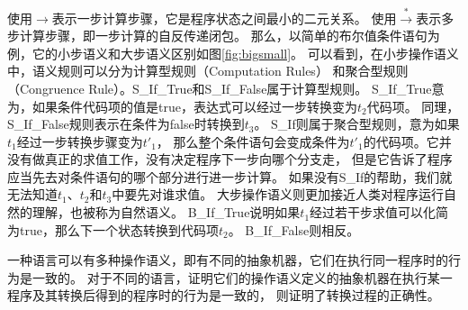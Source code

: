 使用$\rightarrow $表示一步计算步骤，它是程序状态之间最小的二元关系。
使用$\xrightarrow{*} $表示多步计算步骤，即一步计算的自反传递闭包。
那么，以简单的布尔值条件语句为例，它的小步语义和大步语义区别如图\ref{fig:bigsmall}。
可以看到，在小步操作语义中，语义规则可以分为计算型规则（Computation Rules）
和聚合型规则（Congruence Rule）。S\_If\_True和S\_If\_False属于计算型规则。
S\_If\_True意为，如果条件代码项的值是true，表达式可以经过一步转换变为$t_2$代码项。
同理，S\_If\_False规则表示在条件为false时转换到$t_3$。
S\_If则属于聚合型规则，意为如果$t_1$经过一步转换步骤变为$t'_1$，
那么整个条件语句会变成条件为$t'_1$的代码项。它并没有做真正的求值工作，没有决定程序下一步向哪个分支走，
但是它告诉了程序应当先去对条件语句的哪个部分进行进一步计算。
如果没有S\_If的帮助，我们就无法知道$t_1$、$t_2$和$t_3$中要先对谁求值。
大步操作语义则更加接近人类对程序运行自然的理解，也被称为自然语义。
B\_If\_True说明如果$t_1$经过若干步求值可以化简为true，那么下一个状态转换到代码项$t_2$。
B\_If\_False则相反。

一种语言可以有多种操作语义，即有不同的抽象机器，它们在执行同一程序时的行为是一致的。
对于不同的语言，证明它们的操作语义定义的抽象机器在执行某一程序及其转换后得到的程序时的行为是一致的，
则证明了转换过程的正确性。

